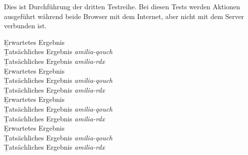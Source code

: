 Dies ist Durchführung der dritten Testreihe.
Bei diesen Tests werden Aktionen ausgeführt während beide Browser mit dem Internet, aber nicht mit dem Server verbunden ist.

%
\b{Erwartetes Ergebnis}\\
\b{Tatsächliches Ergebnis \it{amilia-qouch}}\\
\b{Tatsächliches Ergebnis \it{amilia-rdx}}\\
%
\b{Erwartetes Ergebnis}\\
\b{Tatsächliches Ergebnis \it{amilia-qouch}}\\
\b{Tatsächliches Ergebnis \it{amilia-rdx}}\\
%
\b{Erwartetes Ergebnis}\\
\b{Tatsächliches Ergebnis \it{amilia-qouch}}\\
\b{Tatsächliches Ergebnis \it{amilia-rdx}}\\
%
\b{Erwartetes Ergebnis}\\
\b{Tatsächliches Ergebnis \it{amilia-qouch}}\\
\b{Tatsächliches Ergebnis \it{amilia-rdx}}\\